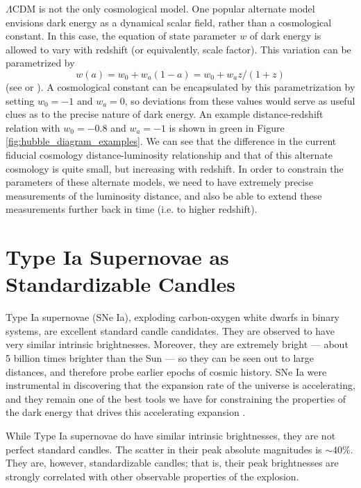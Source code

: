 $\Lambda$CDM is not the only cosmological model. One popular alternate model envisions dark energy as a dynamical scalar field, rather than a cosmological constant. In this case, the equation of state parameter $w$ of dark energy is allowed to vary with redshift (or equivalently, scale factor). This variation can be parametrized by
\begin{equation}
    w(a) = w_0 + w_a(1 - a) = w_0 + w_a z/(1+z)
\end{equation}
(see \citet{chevallier_accelerating_2001} or \citet{linder_exploring_2003}). A cosmological constant can be encapsulated by this parametrization by setting $w_0=-1$ and $w_a=0$, so deviations from these values would serve as useful clues as to the precise nature of dark energy. An example distance-redshift relation with $w_0=-0.8$ and $w_a=-1$ is shown in green in Figure \ref{fig:hubble_diagram_examples}. We can see that the difference in the current fiducial cosmology distance-luminosity relationship and that of this alternate cosmology is quite small, but increasing with redshift. In order to constrain the parameters of these alternate models, we need to have extremely precise measurements of the luminosity distance, and also be able to extend these measurements further back in time (i.e. to higher redshift).

\section{Type Ia Supernovae as Standardizable Candles}
\label{sec:standardizable_candles}
Type Ia supernovae (SNe Ia), exploding carbon-oxygen white dwarfs in binary systems, are excellent standard candle candidates. They are observed to have very similar intrinsic brightnesses. Moreover, they are extremely bright — about 5 billion times brighter than the Sun — so they can be seen out to large distances, and therefore probe earlier epochs of cosmic history. SNe Ia were instrumental in discovering that the expansion rate of the universe is accelerating, and they remain one of the best tools we have for constraining the properties of the dark energy that drives this accelerating expansion \citep{perlmutter_measurements_1999, riess_observational_1998}.

While Type Ia supernovae do have similar intrinsic brightnesses, they are not perfect standard candles. The scatter in their peak absolute magnitudes is $\sim 40$\%. They are, however, standardizable candles; that is, their peak brightnesses are strongly correlated with other observable properties of the explosion.

